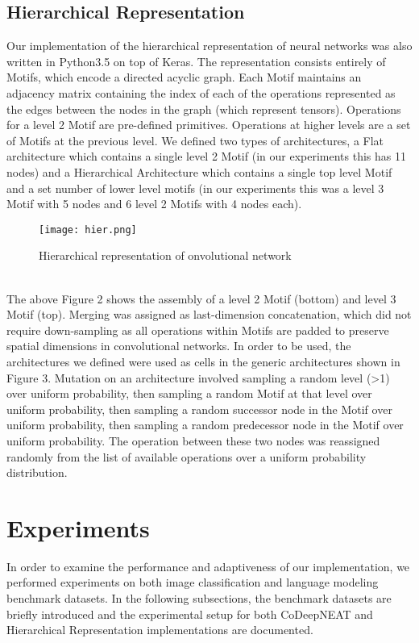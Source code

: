 \documentclass[11pt]{article}
\begin{document}
\subsection{Hierarchical Representation}
Our implementation of the hierarchical representation of neural networks was also written in Python3.5 on top of Keras. The representation consists entirely of Motifs, which encode a directed acyclic graph. Each Motif maintains an adjacency matrix containing the index of each of the operations represented as the edges between the nodes in the graph (which represent tensors). Operations for a level 2 Motif are pre-defined primitives. Operations at higher levels are a set of Motifs at the previous level. We defined two types of architectures, a Flat architecture which contains a single level 2 Motif (in our experiments this has 11 nodes) and a Hierarchical Architecture which contains a single top level Motif and a set number of lower level motifs (in our experiments this was a level 3 Motif with 5 nodes and 6 level 2 Motifs with 4 nodes each).\\ 
\begin{figure}[h]
\centering
\texttt{[image: hier.png]}
\caption{Hierarchical representation of onvolutional network}
\end{figure}
\\The above Figure 2 shows the assembly of a level 2 Motif (bottom) and level 3 Motif (top). Merging was assigned as last-dimension concatenation, which did not require down-sampling as all operations within Motifs are padded to preserve spatial dimensions in convolutional networks. In order to be used, the architectures we defined were used as cells in the generic architectures shown in Figure 3. Mutation on an architecture involved sampling a random level (>1) over uniform probability, then sampling a random Motif at that level over uniform probability, then sampling a random successor node in the Motif over uniform probability, then sampling a random predecessor node in the Motif over uniform probability. The operation between these two nodes was reassigned randomly from the list of available operations over a uniform probability distribution. 
\section{Experiments}
In order to examine the performance and adaptiveness of our implementation, we performed experiments on both image classification and language modeling benchmark datasets. In the following subsections, the benchmark datasets are briefly introduced and the experimental setup for both CoDeepNEAT and Hierarchical Representation implementations are documented.
 
\end{document}
